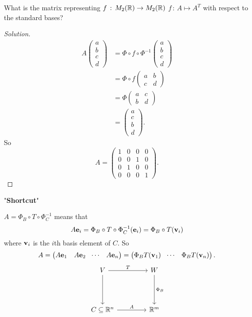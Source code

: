 \documentclass[10pt, a4paper]{article}
\begin{document}
\begin{example}
    What is the matrix representing $f\,:\, M_2(\mathbb{R}) \rightarrow M_2(\mathbb{R})$ $f\,:\,A \mapsto A ^ T$ with respect to the standard bases?
    
    \begin{proof}[Solution]\renewcommand{\qedsymbol}{$\triangle$}
        \begin{align*}
            A\begin{pmatrix}
                a \\ b \\ c \\ d
            \end{pmatrix} &= \Phi \circ f \circ \Phi ^ {-1}\begin{pmatrix}
                a \\ b \\ c \\ d
            \end{pmatrix} \\
            &= \Phi \circ f \begin{pmatrix}
                a & b \\ c & d
            \end{pmatrix} \\
            &= \Phi \begin{pmatrix}
                a & c \\ b & d
            \end{pmatrix} \\
            &= \begin{pmatrix}
                a \\ c \\ b \\ d
            \end{pmatrix}.
        \end{align*}
        So
        \[
        A = \begin{pmatrix}
            1 & 0 & 0 & 0 \\
            0 & 0 & 1 & 0 \\
            0 & 1 & 0 & 0 \\
            0 & 0 & 0 & 1
        \end{pmatrix}.
        \]
    \end{proof}
\end{example}

"\textbf{Shortcut}"

$A = \Phi_B \circ T \circ \Phi_C ^ {-1}$ means that
\[
A\mathbf{e}_i = \Phi_B \circ T \circ \Phi_C ^ {-1}(\mathbf{e}_i) = \Phi_B \circ T (\mathbf{v}_i)
\]
where $\mathbf{v}_i$ is the $i$th basis element of $C$.
So
\[
A = \begin{pmatrix}
    A\mathbf{e}_1 & A\mathbf{e}_2 & \dotsi & A\mathbf{e}_n
\end{pmatrix} = \begin{pmatrix}
    \Phi_B T(\mathbf{v}_1) & \dotsi & \Phi_B T(\mathbf{v}_n)
\end{pmatrix}.
\]
\[
\begin{tikzcd}[row sep = 10ex, column sep = 10ex]
    V \arrow{r}{T} \arrow[swap]{d}{} & W \arrow{d}{\Phi_B} \\
    C \subseteq \R ^ n \arrow{r}{A}& \R ^ m
\end{tikzcd}
\]
\end{document}
